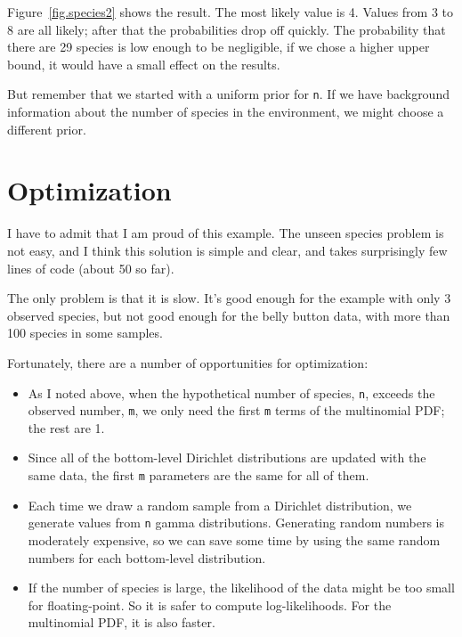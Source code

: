 \documentclass[12pt]{book}
\begin{document}
Figure~\ref{fig.species2} shows the result.  The most likely value is 4.
Values from 3 to 8 are all likely; after that the probabilities
drop off quickly.  The probability that there are 29 species is
low enough to be negligible, if we chose a higher upper bound, it
would have a small effect on the results.

But remember that we started with a uniform prior for {\tt n}.  If we
have background information about the number of species in the
environment, we might choose a different prior.


\section{Optimization}

I have to admit that I am proud of this example.  The unseen species
problem is not easy, and I think this solution is simple and clear,
and takes surprisingly few lines of code (about 50 so far).

The only problem is that it is slow.  It's good enough for the example
with only 3 observed species, but not good enough for the belly button
data, with more than 100 species in some samples.

Fortunately, there are a number of opportunities for optimization:

\begin{itemize}

\item As I noted above, when the hypothetical number of species, {\tt n},
exceeds the observed number, {\tt m}, we only need the first {\tt m}
terms of the multinomial PDF; the rest are 1.

\item Since all of the bottom-level Dirichlet distributions are updated
with the same data, the first {\tt m} parameters are the same for
all of them.

\item Each time we draw a random sample from a Dirichlet distribution,
we generate values from {\tt n} gamma distributions.  Generating
random numbers is moderately expensive, so we can save some time by
using the same random numbers for each bottom-level distribution.

\item If the number of species is large, the likelihood of the data
might be too small for floating-point.  So it is safer to compute
log-likelihoods.  For the multinomial PDF, it is also faster.

\end{itemize}
\end{document}
